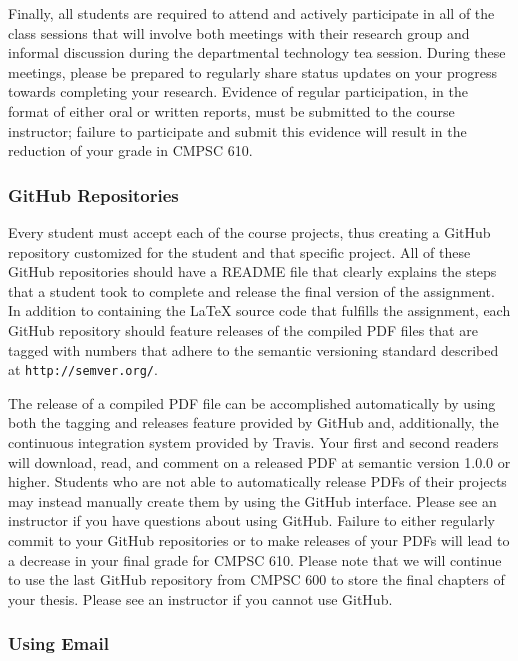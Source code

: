 \documentclass[11pt]{article}
\newcommand{\url}[1]{\lstinline{#1}}
\begin{document}
Finally, all students are required to attend and actively participate in all of
the class sessions that will involve both meetings with their research group
and informal discussion during the departmental technology tea session. During
these meetings, please be prepared to regularly share status updates on your
progress towards completing your research. Evidence of regular participation,
in the format of either oral or written reports, must be submitted to the
course instructor; failure to participate and submit this evidence will result
in the reduction of your grade in CMPSC 610.

\subsubsection*{GitHub Repositories}

Every student must accept each of the course projects, thus creating a GitHub
repository customized for the student and that specific project. All of these
GitHub repositories should have a README file that clearly explains the steps
that a student took to complete and release the final version of the
assignment. In addition to containing the \LaTeX{} source code that fulfills
the assignment, each GitHub repository should feature releases of the compiled
PDF files that are tagged with numbers that adhere to the semantic versioning
standard described at \url{http://semver.org/}.

The release of a compiled PDF file can be accomplished automatically by using
both the tagging and releases feature provided by GitHub and, additionally, the
continuous integration system provided by Travis. Your first and second readers
will download, read, and comment on a released PDF at semantic version 1.0.0 or
higher. Students who are not able to automatically release PDFs of their
projects may instead manually create them by using the GitHub interface. Please
see an instructor if you have questions about using GitHub. Failure to either
regularly commit to your GitHub repositories or to make releases of your PDFs
will lead to a decrease in your final grade for CMPSC 610. Please note that we
will continue to use the last GitHub repository from CMPSC 600 to store the
final chapters of your thesis. Please see an instructor if you cannot use
GitHub.

\subsubsection*{Using Email}
\end{document}
